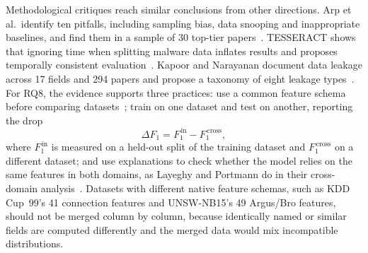 \documentclass[conference]{IEEEtran}
\begin{document}
Methodological critiques reach similar conclusions from other directions. Arp et al.\ identify ten pitfalls, including sampling bias, data snooping and inappropriate baselines, and find them in a sample of 30 top-tier papers~\cite{arp2022dos}. TESSERACT shows that ignoring time when splitting malware data inflates results and proposes temporally consistent evaluation~\cite{pendlebury2019tesseract}. Kapoor and Narayanan document data leakage across 17 fields and 294 papers and propose a taxonomy of eight leakage types~\cite{kapoor2023leakage}. For RQ8, the evidence supports three practices: use a common feature schema before comparing datasets~\cite{sarhan2022standard}; train on one dataset and test on another, reporting the drop
\begin{equation}
\Delta F_1 = F_1^{\,\mathrm{in}} - F_1^{\,\mathrm{cross}},
\label{eq:shift}
\end{equation}
where $F_1^{\,\mathrm{in}}$ is measured on a held-out split of the training dataset and $F_1^{\,\mathrm{cross}}$ on a different dataset; and use explanations to check whether the model relies on the same features in both domains, as Layeghy and Portmann do in their cross-domain analysis~\cite{layeghy2023explainable}. Datasets with different native feature schemas, such as KDD Cup~99's 41 connection features and UNSW-NB15's 49 Argus/Bro features, should not be merged column by column, because identically named or similar fields are computed differently and the merged data would mix incompatible distributions.
\end{document}
